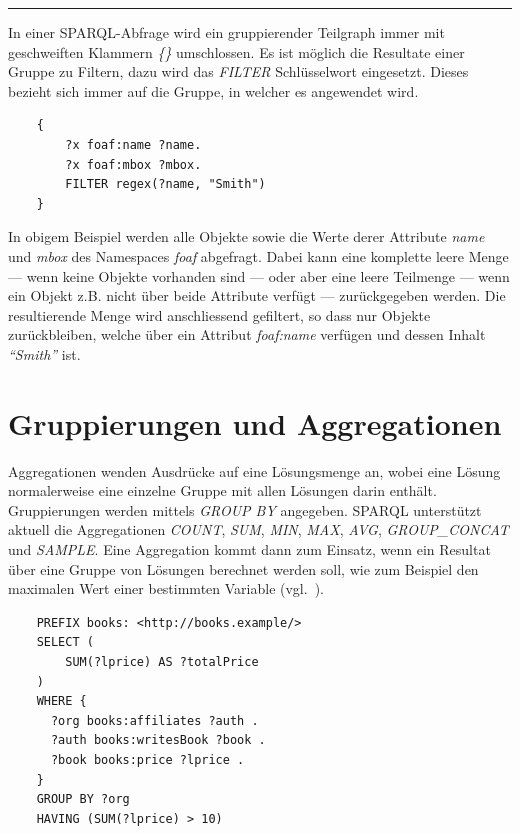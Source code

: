 \noindent\rule[1ex]{\textwidth}{1pt}

In einer SPARQL-Abfrage wird ein gruppierender Teilgraph immer mit geschweiften Klammern \textit{\{\}} umschlossen. Es ist möglich die Resultate einer Gruppe zu Filtern, dazu wird das \textit{FILTER} Schlüsselwort eingesetzt. Dieses bezieht sich immer auf die Gruppe, in welcher es angewendet wird.

\lstset{language=XML}
\begin{lstlisting}
    {
        ?x foaf:name ?name.
        ?x foaf:mbox ?mbox.
        FILTER regex(?name, "Smith")
    }
\end{lstlisting}

In obigem Beispiel werden alle Objekte sowie die Werte derer Attribute \textit{name} und \textit{mbox} des Namespaces \textit{foaf} abgefragt. Dabei kann eine komplette leere Menge --- wenn keine Objekte vorhanden sind --- oder aber eine leere Teilmenge --- wenn ein Objekt z.B. nicht über beide Attribute verfügt --- zurückgegeben werden. Die resultierende Menge wird anschliessend gefiltert, so dass nur Objekte zurückbleiben, welche über ein Attribut \textit{foaf:name} verfügen und dessen Inhalt \textit{``Smith''} ist.

\section{Gruppierungen und Aggregationen}
\label{sec:sparql_gruppierungenaggregationen}

Aggregationen wenden Ausdrücke auf eine Lösungsmenge an, wobei eine Lösung normalerweise eine einzelne Gruppe mit allen Lösungen darin enthält. Gruppierungen werden mittels \textit{GROUP BY} angegeben.
SPARQL unterstützt aktuell die Aggregationen \textit{COUNT}, \textit{SUM}, \textit{MIN}, \textit{MAX}, \textit{AVG}, \textit{GROUP\_CONCAT} und \textit{SAMPLE}. Eine Aggregation kommt dann zum Einsatz, wenn ein Resultat über eine Gruppe von Lösungen berechnet werden soll, wie zum Beispiel den maximalen Wert einer bestimmten Variable (vgl.~\cite[11 Aggregates]{w3sparql_querylang}).

\lstset{language=SQL}
\begin{lstlisting}
    PREFIX books: <http://books.example/>
    SELECT (
        SUM(?lprice) AS ?totalPrice
    )
    WHERE {
      ?org books:affiliates ?auth .
      ?auth books:writesBook ?book .
      ?book books:price ?lprice .
    }
    GROUP BY ?org
    HAVING (SUM(?lprice) > 10)
\end{lstlisting}

